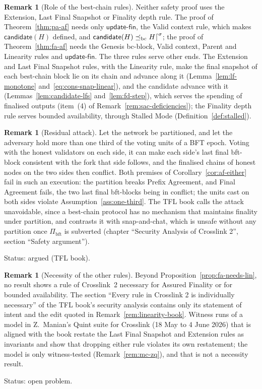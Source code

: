 \documentclass[11pt,a4paper]{article}
\theoremstyle{definition}
\newtheorem{remark}[theorem]{Remark}
\newcommand{\bc}{\mathrm{bc}}
\newcommand{\bft}{\mathrm{bft}}
\newcommand{\preceqbc}{\preceq_{\bc}}
\newcommand{\Pibft}{\Pi_{\bft}}
\newcommand{\candidate}{\mathsf{candidate}}
\newcommand{\updatefin}{\mathsf{update\text{-}fin}}
\begin{document}
\begin{remark}[Role of the best-chain rules]\label{rem:bc-rules-role}
Neither safety proof uses the Extension, Last Final Snapshot or Finality
depth rule. The proof of Theorem~\ref{thm:pa-af} needs only $\updatefin$,
the Valid context rule, which makes $\candidate(H)$ defined, and
$\candidate(H) \preceqbc H\trunc{\sigma}$; the proof of
Theorem~\ref{thm:fa-af} needs the Genesis bc-block, Valid context, Parent and
Linearity rules and $\updatefin$. The three rules serve other ends. The
Extension and Last Final Snapshot rules, with the Linearity rule, make the
final snapshot of each best-chain block lie on its chain and advance along it
(Lemma~\ref{lem:lf-monotone} and~\eqref{eq:cons-snap-linear}), and the
candidate advance with it (Lemmas~\ref{lem:candidate-lfs}
and~\ref{lem:fd-step}), which serves the spending of finalised outputs
(item~(4) of Remark~\ref{rem:sac-deficiencies}); the Finality depth rule serves
bounded availability, through Stalled Mode (Definition~\ref{def:stalled}).
\end{remark}

\begin{remark}[Residual attack]\label{rem:residual}
Let the network be partitioned, and let the adversary hold more than one
third of the voting units of a BFT epoch. Voting with the honest validators
on each side, it can make each side's last final bft-block consistent with
the fork that side follows, and the finalised chains of honest nodes on the
two sides then conflict. Both premises of Corollary~\ref{cor:af-either} fail
in such an execution: the partition breaks Prefix Agreement, and Final
Agreement fails, the two last final bft-blocks being in conflict; the units
cast on both sides violate Assumption~\ref{ass:one-third}. The TFL book
calls the attack unavoidable, since a best-chain protocol has no mechanism
that maintains finality under partition, and contrasts it with
snap-and-chat, which is unsafe without any partition once $\Pibft$ is
subverted (chapter ``Security Analysis of Crosslink 2'', section ``Safety
argument'').

Status: argued (TFL book).
\end{remark}

\begin{remark}[Necessity of the other rules]\label{rem:rule-necessity}
Beyond Proposition~\ref{prop:fa-needs-lin}, no result shows a rule of
Crosslink~2 necessary for Assured Finality or for bounded availability. The
section ``Every rule in Crosslink 2 is individually necessary'' of the TFL
book's security analysis contains only its statement of intent and the edit
quoted in Remark~\ref{rem:linearity-book}. Witness runs of a model in
Z.~Manian's Quint suite for Crosslink (18 May to 4 June 2026) that is aligned
with the book restate the Last Final Snapshot and Extension rules as
invariants and show that dropping either rule violates its own restatement;
the model is only witness-tested (Remark~\ref{rem:mc-zq}), and that is not a
necessity result.

Status: open problem.
\end{remark}
\end{document}

